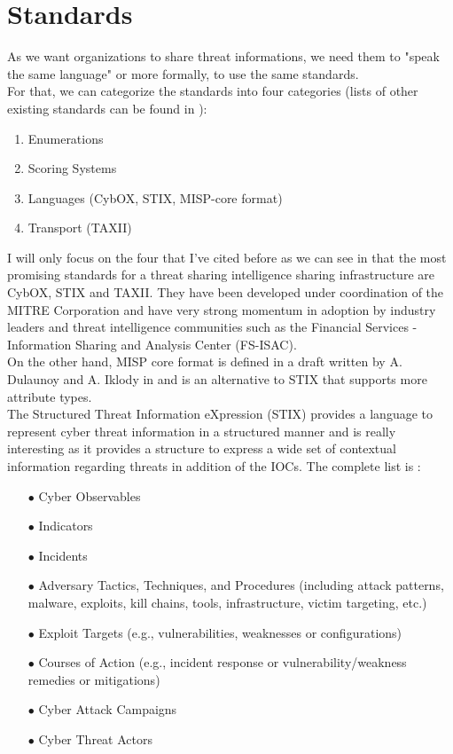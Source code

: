 \documentclass{eplmastersthesis}
\begin{document}
\section{Standards}
As we want organizations to share threat informations, we need them to "speak the same language" or more formally, to use the same standards.\\
For that, we can categorize the standards into four categories (lists of other existing standards can be found in \cite{AwesomeTreat, mohaisen2017rethinking}):
\begin{enumerate}
\item Enumerations
\item Scoring Systems
\item Languages (CybOX, STIX, MISP-core format)
\item Transport (TAXII)
\end{enumerate}

I will only focus on the four that I've cited before as we can see in \cite{fransen2015cyber, sauerwein2017threat} that the most promising standards for a threat sharing intelligence sharing infrastructure are CybOX, STIX and TAXII. They have been developed under coordination of the MITRE Corporation and have very strong momentum in adoption by industry leaders and threat intelligence communities such as the Financial Services - Information Sharing and Analysis Center (FS-ISAC).\\
On the other hand, MISP core format is defined in a draft written by A. Dulaunoy and A. Iklody in \cite{MispDraft} and is an alternative to STIX that supports more attribute types.\\
The  Structured Threat Information eXpression (STIX) \cite{barnum2012standardizing} provides a language to represent cyber threat information in a structured manner and is really interesting as it provides a structure to express a wide set of contextual information regarding threats in addition of the IOCs. The complete list is :

\begin{itemize}
\item[$\bullet$] Cyber Observables
\item[$\bullet$] Indicators
\item[$\bullet$] Incidents
\item[$\bullet$] Adversary Tactics, Techniques, and Procedures (including attack patterns, malware, exploits, kill
chains, tools, infrastructure, victim targeting, etc.)
\item[$\bullet$] Exploit Targets (e.g., vulnerabilities, weaknesses or configurations)
\item[$\bullet$] Courses of Action (e.g., incident response or vulnerability/weakness remedies or mitigations)
\item[$\bullet$] Cyber Attack Campaigns
\item[$\bullet$] Cyber Threat Actors
\end{itemize}
\end{document}
